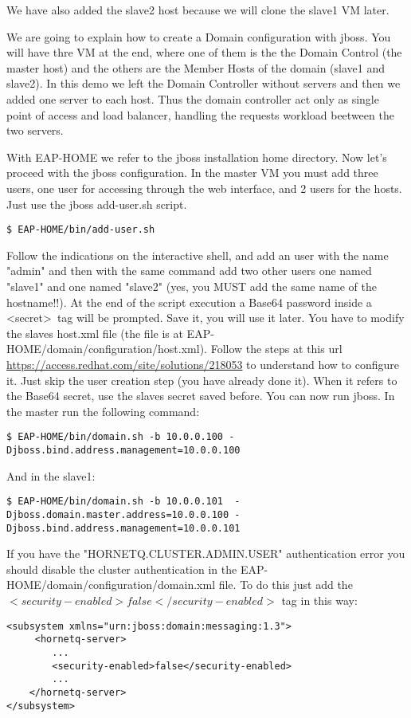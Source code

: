 \documentclass[11pt,a4paper]{article}
\begin{document}
We have also added the slave2 host because we will clone the slave1 VM later.

We are going to explain how to create a Domain configuration with jboss. You will have thre VM at the end, where one of them is the the Domain Control (the master host) and the others are the Member Hosts of the domain (slave1 and slave2). In this demo we left the Domain Controller without servers and then we added one server to each host. Thus the domain controller act only as single point of access and  load balancer, handling the requests workload beetween the two servers.

With EAP-HOME we refer to the jboss installation home directory. Now let's proceed with the jboss configuration.
In the master VM you must add three users, one user for accessing through the web interface, and 2 users for the hosts. Just use the jboss add-user.sh script. 
\begin{lstlisting}
$ EAP-HOME/bin/add-user.sh
\end{lstlisting}
Follow the indications on the interactive shell, and add an user with the name "admin" and then with the same command add two other users one named "slave1" and one named "slave2" (yes, you MUST add the same name of the hostname!!).
At the end of the script execution a Base64 password inside a \textless secret\textgreater \ tag will be prompted. Save it, you will use it later. You have to modify the slaves host.xml file (the file is at EAP-HOME/domain/configuration/host.xml).
Follow the steps at this url \url{https://access.redhat.com/site/solutions/218053} to understand how to configure it. Just skip the user creation step (you have already done it). When it refers to the Base64 secret, use the slaves secret saved before.
You can now run jboss. In the master run the following command:
\begin{lstlisting}
$ EAP-HOME/bin/domain.sh -b 10.0.0.100 -Djboss.bind.address.management=10.0.0.100
\end{lstlisting}
And in the slave1:
\begin{lstlisting}
$ EAP-HOME/bin/domain.sh -b 10.0.0.101  -Djboss.domain.master.address=10.0.0.100 -Djboss.bind.address.management=10.0.0.101
\end{lstlisting}
If you have the "HORNETQ.CLUSTER.ADMIN.USER" authentication error you should disable the cluster authentication in the EAP-HOME/domain/configuration/domain.xml file. To do this just add the $<security-enabled>false</security-enabled>$ tag in this way:
\begin{lstlisting}
<subsystem xmlns="urn:jboss:domain:messaging:1.3">
     <hornetq-server>
		...    
        <security-enabled>false</security-enabled>
    	...
    </hornetq-server>
</subsystem>
\end{lstlisting}
\end{document}

